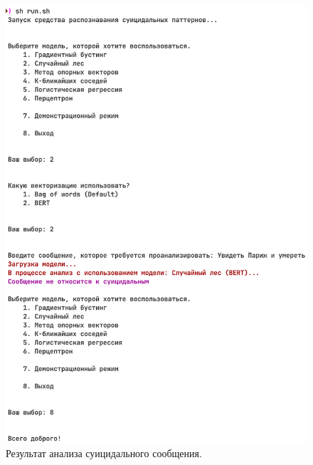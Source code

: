 \begin{figure}[H]
	\centering
	\includegraphics[width=\textwidth]{inc/utility2.png}
	\caption{ Результат анализа суицидального сообщения. }
	\label{img:utility2}
\end{figure}

